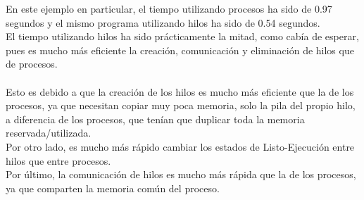 \documentclass[12pt]{article}
\begin{document}
En este ejemplo en particular, el tiempo utilizando procesos ha sido de 0.97 segundos y el mismo programa utilizando hilos ha sido de 0.54 segundos.\\ El tiempo utilizando hilos ha sido prácticamente la mitad, como cabía de esperar, pues es mucho más eficiente la creación, comunicación y eliminación de hilos que de procesos.\\\\ Esto es debido a que la creación de los hilos es mucho más eficiente que la de los procesos, ya que necesitan copiar muy poca memoria, solo la pila del propio hilo, a diferencia de los procesos, que tenían que duplicar toda la memoria reservada/utilizada.\\Por otro lado, es mucho más rápido cambiar los estados de Listo-Ejecución entre hilos que entre procesos.\\Por último, la comunicación de hilos es mucho más rápida que la de los procesos, ya que comparten la memoria común del proceso. 
\end{document}
